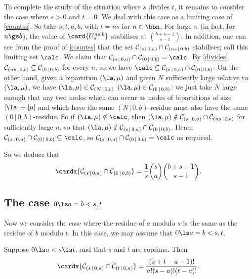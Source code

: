 \documentclass[a4paper, 11pt, twoside]{article}
\begin{document}
\begin{rmk}
To complete the study of the situation where $s$ divides $t$, it remains to consider the case where $s>0$ and $t=0$. We deal with this case as a limiting case of \cref{countss}. So take $s,t,a,b$, with $t=ns$ for $n\in\bbn$. For large $n$ (in fact, for $n\gs b$), the value of $\card{U_s^{ns,b}}$ stabilises at $\binom{b+s-1}{s-1}$. In addition, one can see from the proof of \cref{countss} that the set $\mathcal{C}_{(s\,|\,0,a)}\cap\mathcal{C}_{(ns\,|\,0,b)}$ stabilises; call this limiting set $\calc$. We claim that $\bc sa\cap\bc0b=\calc$. By \cref{divides}, $\mathcal{C}_{(ns\,|\,0,b)}\subseteq\mathcal{C}_{(0\,|\,0,b)}$ for every $n$, so we have $\calc\subseteq\bc sa\cap\bc0b$. On the other hand, given a bipartition $(\la,\mu)$ and given $N$ sufficiently large relative to $(\la,\mu)$, we have $(\la,\mu)\in\bc Nb$ \iff $(\la,\mu)\in\bc0b$: we just take $N$ large enough that any two nodes which can occur as nodes of bipartitions of size $|\la|+|\mu|$ and which have the same $(N\,|\,0,b)$-residue must also have the same $(0\,|\,0,b)$-residue. So if $(\la,\mu)\notin\calc$, then $(\la,\mu)\notin\bc sa\cap\bc{ns}b$ for sufficiently large $n$, so that $(\la,\mu)\notin\bc sa\cap\bc0b$. Hence $\bc sa\cap\bc0b\subseteq\calc$, so $\bc sa\cap\bc0b=\calc$ as required.

So we deduce that
\[
\cardx{\bc sa\cap\bc 0b}=\frac1s\binom sa\binom{b+s-1}{s-1}.
\]
\end{rmk}

\subsection{The case $0\ls a=b<s,t$}\label{aasec}

Now we consider the case where the residue of $a$ modulo $s$ is the same as the residue of $b$ modulo $t$. In this case, we may assume that $0\ls a=b<s,t$.

\begin{thm}\label{countaa}
Suppose $0\ls a<s\ls t$, and that $s$ and $t$ are coprime. Then
\[
\cardx{\bc sa\cap\bc ta}=\frac{(s+t-a-1)!}{a!(s-a)!(t-a)!}.
\]
\end{thm}
\end{document}
